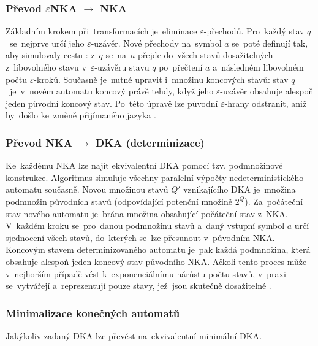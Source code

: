 \documentclass[
  master,
  program=ainfvs,
  printversion,
  figures=false,
  tables=false,
  glossaries,
  index
]{kidiplom}
\begin{document}
\subsubsection{Převod $\varepsilon$NKA $\rightarrow$ NKA} \label{par:euzaver}
Základním krokem při~transformacích je~eliminace $\varepsilon$-přechodů. Pro~každý stav $q$~se~nejprve určí jeho $\varepsilon$-uzávěr. Nové přechody na~symbol $a$ se~poté definují tak, aby simulovaly cestu : z~$q$ se~na~$a$ přejde do~všech stavů dosažitelných z~libovolného stavu v~$\varepsilon$-uzávěru stavu $q$ po~přečtení $a$ a~následném libovolném počtu $\varepsilon$-kroků. Současně je~nutné upravit i~množinu koncových stavů: stav $q$~je~v~novém automatu koncový právě tehdy, když jeho $\varepsilon$-uzávěr obsahuje alespoň jeden původní koncový stav. Po~této úpravě lze původní $\varepsilon$-hrany odstranit, aniž by~došlo ke~změně přijímaného jazyka \cite[kapitola~11]{balun_fj}.

\subsubsection{Převod NKA $\rightarrow$ DKA (determinizace)} \label{par:determinizace}
Ke~každému \gls{NKA} lze najít ekvivalentní \gls{DKA} pomocí tzv. podmnožinové konstrukce. Algoritmus simuluje všechny paralelní výpočty nedeterministického automatu současně. Novou množinou stavů $Q'$ vznikajícího \gls{DKA} je~množina podmnožin původních stavů (odpovídající potenční množině $2^Q$). Za~počáteční stav nového automatu je~brána množina obsahující počáteční stav z~\gls{NKA}. V~každém kroku se~pro~danou podmnožinu stavů a~daný vstupní symbol $a$ určí sjednocení všech stavů, do~kterých se~lze přesunout v~původním \gls{NKA}. Koncovým stavem determinizovaného automatu je~pak každá podmnožina, která obsahuje alespoň jeden koncový stav původního \gls{NKA}. Ačkoli tento proces může v~nejhorším případě vést k~exponenciálnímu nárůstu počtu stavů, v~praxi se~vytvářejí a~reprezentují pouze stavy, jež~jsou skutečně dosažitelné \cite[kapitola~3.9]{jancar_ti} \cite[kapitola~10]{balun_fj}.

\subsubsection{Minimalizace konečných automatů} \label{par:minimalize}
Jakýkoliv zadaný \gls{DKA} lze převést na~ekvivalentní minimální \gls{DKA}.
\end{document}
